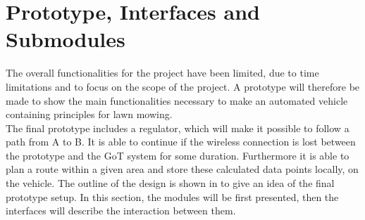 \section{Prototype, Interfaces and Submodules} \label{Finalprototype}





The overall functionalities for the project have been limited, due to time limitations and to focus on the scope of the project. A prototype will therefore be made to show the main functionalities necessary to make an automated vehicle containing principles for lawn mowing.\\
The final prototype includes a regulator, which will make it possible to follow a path from A to B. It is able to continue if the wireless connection is lost between the prototype and the GoT system for some duration. Furthermore it is able to plan a route within a given area and store these calculated data points locally, on the vehicle. The outline of the design is shown in  to give an idea of the final prototype setup. In this section, the modules will be first presented, then the interfaces will describe the interaction between them.

